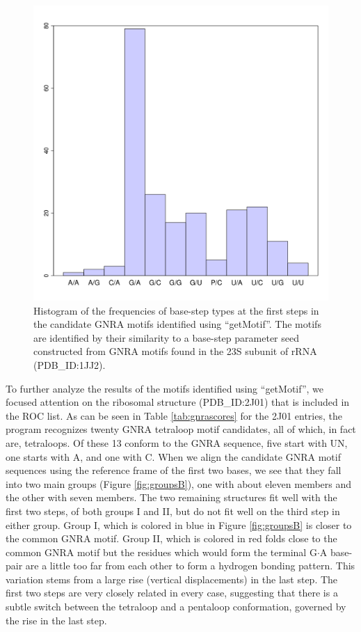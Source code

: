 \begin{figure}
\centering
\includegraphics[angle=0, scale=0.5]{Chapter5/steptypesdist.png}
\caption{Histogram of the frequencies  of base-step types at the first
  steps in  the candidate  GNRA motifs identified  using ``getMotif''.
  The  motifs  are  identified  by  their similarity  to  a  base-step
  parameter seed constructed from GNRA motifs found in the 23S subunit
  of rRNA (PDB\_ID:1JJ2).}
\label{fig:steptype}
\end{figure}

To  further  analyze  the  results  of  the  motifs  identified  using
``getMotif'',  we   focused  attention  on   the  ribosomal  structure
(PDB\_ID:2J01) that  is included in the  ROC list.  As can  be seen in
Table   \ref{tab:gnrascores}  for  the   2J01  entries,   the  program
recognizes twenty  GNRA tetraloop motif  candidates, all of  which, in
fact are, tetraloops.  Of these 13 conform to  the GNRA sequence, five
start with UN, one  starts with A, and one with C.   When we align the
candidate GNRA motif sequences using  the reference frame of the first
two  bases,  we  see that  they  fall  into  two main  groups  (Figure
\ref{fig:groupsB}), one  with about eleven members and  the other with
seven members.  The  two remaining structures fit well  with the first
two steps, of both  groups I and II, but do not  fit well on the third
step in  either group.  Group  I, which is  colored in blue  in Figure
\ref{fig:groupsB} is closer to the  common GNRA motif. Group II, which
is  colored in  red  folds close  to  the common  GNRA  motif but  the
residues  which would  form  the terminal  G$\cdot$A  base-pair are  a
little  too   far  from  each   other  to  form  a   hydrogen  bonding
pattern.   This  variation   stems   from  a   large  rise   (vertical
displacements) in the last step.  The first two steps are very closely
related  in every  case,  suggesting  that there  is  a subtle  switch
between the  tetraloop and a  pentaloop conformation, governed  by the
rise in the last step.

